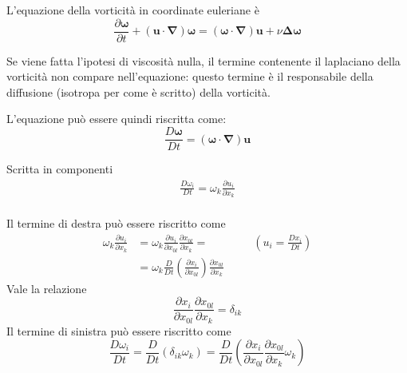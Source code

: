 
L'equazione della vorticità in coordinate euleriane è
\begin{equation}
 \frac{\partial \bm{\omega}}{\partial t}
   + (\bm{u}\cdot\bm{\nabla}) \bm{\omega} =
 (\bm{\omega}\cdot\bm{\nabla}) \bm{u} + \nu \bm{\Delta} \bm{\omega}
\end{equation}

Se viene fatta l'ipotesi di viscosità nulla, il termine contenente il 
 laplaciano della vorticità non compare nell'equazione: questo termine
 è il responsabile della diffusione (isotropa per come è scritto) della
 vorticità.
 
L'equazione può essere quindi riscritta come:
 \begin{equation}
  \frac{D\bm{\omega}}{Dt} = (\bm{\omega} \cdot \bm{\nabla}) \bm{u}
 \end{equation}

\noindent 
Scritta in componenti
\begin{equation}
\begin{aligned}
  \frac{D \omega_i}{D t} = \omega_k \frac{\partial u_i}{\partial x_k} \\
\end{aligned}
\end{equation}

\noindent
Il termine di destra può essere riscritto come
\begin{equation}
\begin{aligned}
 \omega_k \frac{\partial u_i}{\partial x_k} & = 
 \omega_k \frac{\partial u_i}{\partial x_{0 l}}
      \frac{\partial x_{0 l}}{\partial x_k} = \qquad \qquad
      \left(u_i = \frac{D x_i}{D t}\right)  \\
 & = \omega_k \frac{D}{Dt} \left( \frac{\partial x_i}{\partial x_{0 l}}
    \right)\frac{\partial x_{0 l}}{\partial x_k} 
\end{aligned}
\end{equation}
Vale la relazione
\begin{equation}
 \frac{\partial x_i}{\partial x_{0 l}}
   \frac{\partial x_{0 l}}{\partial x_k} = \delta_{ik}
\end{equation}
Il termine di sinistra può essere riscritto come
\begin{equation}
 \frac{D \omega_i}{Dt} = \frac{D}{Dt} \left(\delta_{ik} \omega_k \right) =
 \frac{D}{Dt} \left( \frac{\partial x_i}{\partial x_{0 l}}
   \frac{\partial x_{0 l}}{\partial x_k} \omega_k \right)
\end{equation}

